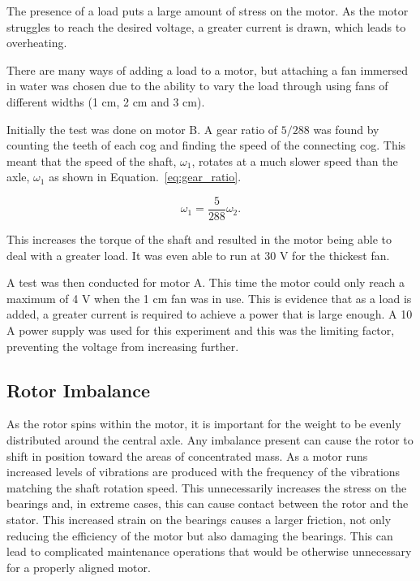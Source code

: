 The presence of a load puts a large amount of stress on the motor. As the motor struggles to reach the desired voltage, a greater current is drawn, which leads to overheating.
        
There are many ways of adding a load to a motor, but attaching a fan immersed in water was chosen due to the ability to vary the load through using fans of different widths (1 cm, 2 cm and 3 cm).
    
Initially the test was done on motor B. A gear ratio of ${5}/{288}$ was found by counting the teeth of each cog and finding the speed of the connecting cog. This meant that the speed of the shaft, $\omega_1$, rotates at a much slower speed than the axle, $\omega _1$ as shown in Equation.~\eqref{eq:gear_ratio}.

\begin{equation}
\omega_1 = \frac{5}{288} \omega_2.
\label{eq:gear_ratio}
\end{equation}

This increases the torque of the shaft and resulted in the motor being able to deal with a greater load. It was even able to run at 30 V for the thickest fan.

A test was then conducted for motor A. This time the motor could only reach a maximum of 4 V when the 1 cm fan was in use. This is evidence that as a load is added, a greater current is required to achieve a power that is large enough. A 10 A power supply was used for this experiment and this was the limiting factor, preventing the voltage from increasing further.

\subsection{Rotor Imbalance}
As the rotor spins within the motor, it is important for the weight to be evenly distributed around the central axle. Any imbalance present can cause the rotor to shift in position toward the areas of concentrated mass. As a motor runs increased levels of vibrations are produced with the frequency of the vibrations matching the shaft rotation speed. This unnecessarily increases the stress on the bearings and, in extreme cases, this can cause contact between the rotor and the stator. This increased strain on the bearings causes a larger friction, not only reducing the efficiency of the motor but also damaging the bearings. This can lead to complicated maintenance operations that would be otherwise unnecessary for a properly aligned motor.

